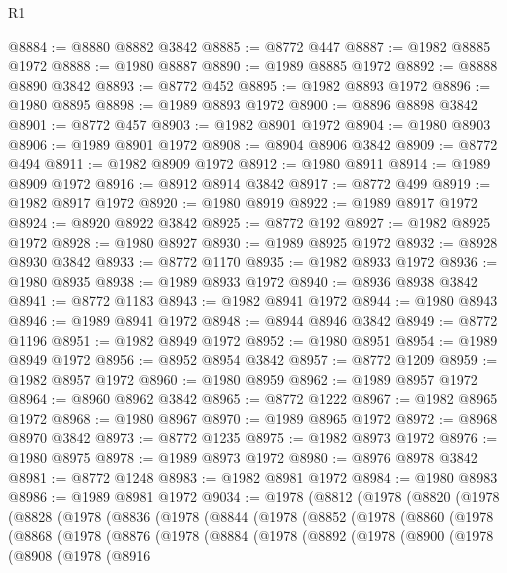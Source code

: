 \begin{lexlean}{R1}
\begin{coremodule}
@8884 := @8880 @8882 @3842
@8885 := @8772 @447
@8887 := @1982 @8885 @1972
@8888 := @1980 @8887
@8890 := @1989 @8885 @1972
@8892 := @8888 @8890 @3842
@8893 := @8772 @452
@8895 := @1982 @8893 @1972
@8896 := @1980 @8895
@8898 := @1989 @8893 @1972
@8900 := @8896 @8898 @3842
@8901 := @8772 @457
@8903 := @1982 @8901 @1972
@8904 := @1980 @8903
@8906 := @1989 @8901 @1972
@8908 := @8904 @8906 @3842
@8909 := @8772 @494
@8911 := @1982 @8909 @1972
@8912 := @1980 @8911
@8914 := @1989 @8909 @1972
@8916 := @8912 @8914 @3842
@8917 := @8772 @499
@8919 := @1982 @8917 @1972
@8920 := @1980 @8919
@8922 := @1989 @8917 @1972
@8924 := @8920 @8922 @3842
@8925 := @8772 @192
@8927 := @1982 @8925 @1972
@8928 := @1980 @8927
@8930 := @1989 @8925 @1972
@8932 := @8928 @8930 @3842
@8933 := @8772 @1170
@8935 := @1982 @8933 @1972
@8936 := @1980 @8935
@8938 := @1989 @8933 @1972
@8940 := @8936 @8938 @3842
@8941 := @8772 @1183
@8943 := @1982 @8941 @1972
@8944 := @1980 @8943
@8946 := @1989 @8941 @1972
@8948 := @8944 @8946 @3842
@8949 := @8772 @1196
@8951 := @1982 @8949 @1972
@8952 := @1980 @8951
@8954 := @1989 @8949 @1972
@8956 := @8952 @8954 @3842
@8957 := @8772 @1209
@8959 := @1982 @8957 @1972
@8960 := @1980 @8959
@8962 := @1989 @8957 @1972
@8964 := @8960 @8962 @3842
@8965 := @8772 @1222
@8967 := @1982 @8965 @1972
@8968 := @1980 @8967
@8970 := @1989 @8965 @1972
@8972 := @8968 @8970 @3842
@8973 := @8772 @1235
@8975 := @1982 @8973 @1972
@8976 := @1980 @8975
@8978 := @1989 @8973 @1972
@8980 := @8976 @8978 @3842
@8981 := @8772 @1248
@8983 := @1982 @8981 @1972
@8984 := @1980 @8983
@8986 := @1989 @8981 @1972
@9034 := @1978
    (@8812
      (@1978
        (@8820
          (@1978
            (@8828
              (@1978
                (@8836
                  (@1978
                    (@8844
                      (@1978
                        (@8852
                          (@1978
                            (@8860
                              (@1978
                                (@8868
                                  (@1978
                                    (@8876
                                      (@1978
                                        (@8884
                                          (@1978
                                            (@8892
                                              (@1978
                                                (@8900
                                                  (@1978
                                                    (@8908
                                                      (@1978
                                                        (@8916

\end{coremodule}
\end{lexlean}
